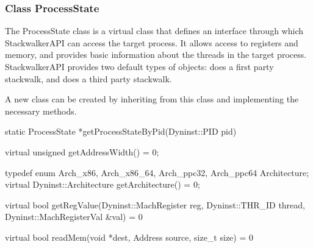 \subsubsection{Class ProcessState}
\label{subsec:processstate}

The ProcessState class is a virtual class that defines an interface through
which StackwalkerAPI can access the target process. It allows access to
registers and memory, and provides basic information about the threads in the
target process. StackwalkerAPI provides two default types of 
objects:  does a first party stackwalk, and  does a third party
stackwalk.

A new  class can be created by inheriting from this class and
implementing the necessary methods. 

\begin{apient}
static ProcessState *getProcessStateByPid(Dyninst::PID pid)
\end{apient}


\begin{apient}
virtual unsigned getAddressWidth() = 0;
\end{apient}

\begin{apient}
 typedef enum { Arch_x86, Arch_x86_64, Arch_ppc32, Arch_ppc64 }
 Architecture;
 virtual Dyninst::Architecture getArchitecture() = 0;
\end{apient}

\begin{apient}
virtual bool getRegValue(Dyninst::MachRegister reg, 
                         Dyninst::THR_ID thread, 
                         Dyninst::MachRegisterVal &val) = 0
\end{apient}

\begin{apient}
virtual bool readMem(void *dest, Address source, size_t size) = 0
\end{apient}

